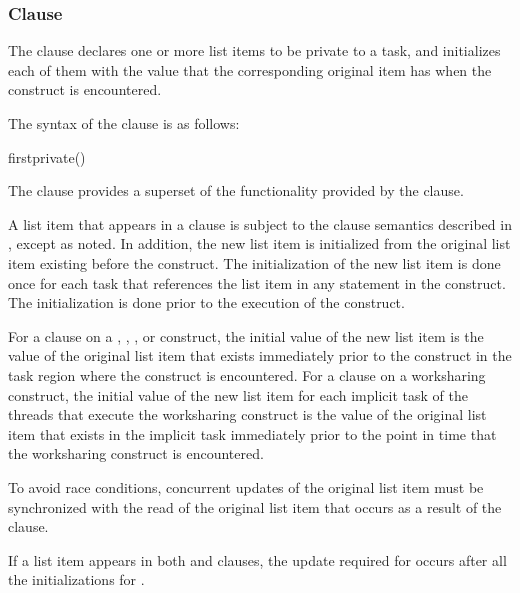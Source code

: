 \subsubsection{ Clause}
\label{subsubsec:firstprivate clause}
\summary
The  clause declares one or more list items to be private to a task, and 
initializes each of them with the value that the corresponding original item has when the 
construct is encountered. 

\syntax
The syntax of the  clause is as follows:

\begin{boxedcode}
firstprivate()
\end{boxedcode}

\descr
The  clause provides a superset of the functionality provided by the 
 clause. 

A list item that appears in a  clause is subject to the  clause 
semantics described in 
, 
except as noted. In addition, the 
new list item is initialized from the original list item existing before the construct. The 
initialization of the new list item is done once for each task that references the list item 
in any statement in the construct. The initialization is done prior to the execution of the 
construct.

For a  clause on a , , , or  construct, the initial 
value of the new list item is the value of the original list item that exists immediately 
prior to the construct in the task region where the construct is encountered. For a 
 clause on a worksharing construct, the initial value of the new list 
item for each implicit task of the threads that execute the worksharing construct is the 
value of the original list item that exists in the implicit task immediately prior to the 
point in time that the worksharing construct is encountered.

To avoid race conditions, concurrent updates of the original list item must be 
synchronized with the read of the original list item that occurs as a result of the 
 clause.

If a list item appears in both  and  clauses, the update 
required for  occurs after all the initializations for .

